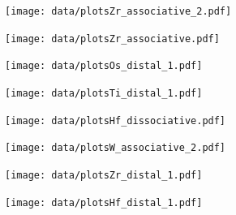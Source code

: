 \begin{figure}
\centering
\texttt{[image: data/plotsZr\_associative\_2.pdf]}
\end{figure}

\begin{figure}
\centering
\texttt{[image: data/plotsZr\_associative.pdf]}
\end{figure}

\begin{figure}
\centering
\texttt{[image: data/plotsOs\_distal\_1.pdf]}
\end{figure}

\begin{figure}
\centering
\texttt{[image: data/plotsTi\_distal\_1.pdf]}
\end{figure}

\begin{figure}
\centering
\texttt{[image: data/plotsHf\_dissociative.pdf]}
\end{figure}

\begin{figure}
\centering
\texttt{[image: data/plotsW\_associative\_2.pdf]}
\end{figure}

\begin{figure}
\centering
\texttt{[image: data/plotsZr\_distal\_1.pdf]}
\end{figure}

\begin{figure}
\centering
\texttt{[image: data/plotsHf\_distal\_1.pdf]}
\end{figure}


